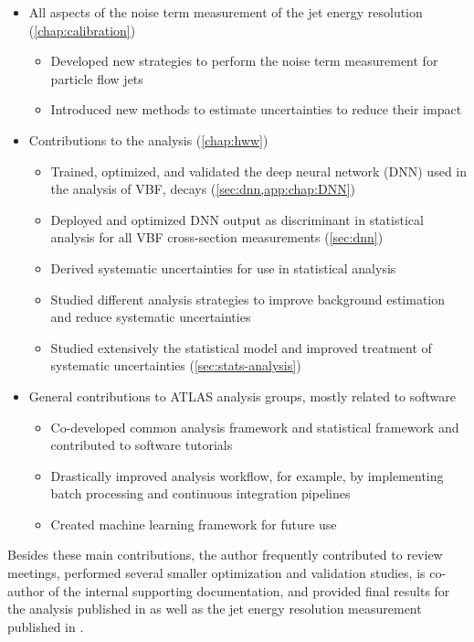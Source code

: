 \begin{itemize}
    \item All aspects of the noise term measurement of the jet energy resolution (\cref{chap:calibration})
          \begin{itemize}
              \item Developed new strategies to perform the noise term measurement for particle flow jets
              \item Introduced new methods to estimate uncertainties to reduce their impact
          \end{itemize}
    \item Contributions to the \HWW analysis (\cref{chap:hww})
          \begin{itemize}
              \item Trained, optimized, and validated the deep neural network (DNN) used in the analysis of VBF, \HWW decays (\cref{sec:dnn,app:chap:DNN})
              \item Deployed and optimized DNN output as discriminant in statistical analysis for all VBF cross-section measurements (\cref{sec:dnn})
              \item Derived systematic uncertainties for use in statistical analysis
              \item Studied different analysis strategies to improve background estimation and reduce systematic uncertainties
              \item Studied extensively the statistical model and improved treatment of systematic uncertainties (\cref{sec:stats-analysis})
          \end{itemize}
    \item General contributions to ATLAS analysis groups, mostly related to software
          \begin{itemize}
              \item Co-developed common analysis framework and statistical framework and contributed to software tutorials
              \item Drastically improved analysis workflow, for example, by implementing batch processing and continuous integration pipelines
              \item Created machine learning framework for future use
          \end{itemize}
\end{itemize}
Besides these main contributions, the author frequently contributed to review meetings, performed several smaller optimization and validation studies, is co-author of the internal supporting documentation, and provided final results for the analysis published in  as well as the jet energy resolution measurement published in .


